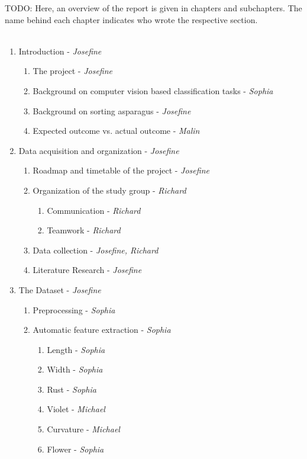 TODO: Here, an overview of the report is given in chapters and subchapters. The name behind each chapter indicates who wrote the respective section.
\\
\\
\begin{enumerate}
\item Introduction - \textit{Josefine}
	\begin{enumerate}
	\item The project - \textit{Josefine}
	\item Background on computer vision based classification tasks - \textit{Sophia}
	\item Background on sorting asparagus - \textit{Josefine}
	\item Expected outcome vs. actual outcome - \textit{Malin}
	\end{enumerate}
\item Data acquisition and organization - \textit{Josefine}
	\begin{enumerate}
	\item Roadmap and timetable of the project - \textit{Josefine}
	\item Organization of the study group - \textit{Richard}
		\begin{enumerate}
		\item Communication - \textit{Richard}
		\item Teamwork - \textit{Richard}
		\end{enumerate}
	\item Data collection - \textit{Josefine, Richard}
	\item Literature Research - \textit{Josefine}
	\end{enumerate}
\item The Dataset - \textit{Josefine}
	\begin{enumerate}
	\item Preprocessing - \textit{Sophia}
	\item Automatic feature extraction - \textit{Sophia}
		\begin{enumerate}
		\item Length - \textit{Sophia}
		\item Width - \textit{Sophia}
		\item Rust - \textit{Sophia}
		\item Violet - \textit{Michael}
		\item Curvature - \textit{Michael}
		\item Flower - \textit{Sophia}
		\end{enumerate}

\end{enumerate}
\end{enumerate}
